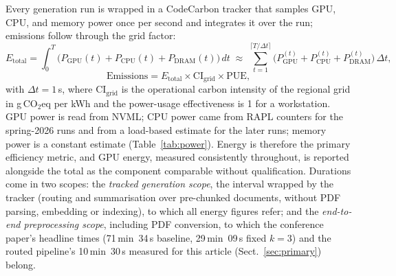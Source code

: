 \documentclass[pdflatex,sn-mathphys-num]{sn-jnl}
\newcommand{\gco}{g\,CO$_2$eq}
\theoremstyle{thmstyleone}%
\theoremstyle{thmstylethree}%
\begin{document}
Every generation run is wrapped in a CodeCarbon tracker \cite{codecarbon_software,lacoste2019quantifyingcarbonemissionsmachine} that samples GPU, CPU, and memory power once per second and integrates it over the run; emissions follow through the grid factor:
\begin{equation}
E_{\mathrm{total}}=\int_{0}^{T}\bigl(P_{\mathrm{GPU}}(t)+P_{\mathrm{CPU}}(t)+P_{\mathrm{DRAM}}(t)\bigr)\,dt
\;\approx\;\sum_{t=1}^{\lceil T/\Delta t\rceil}\bigl(P^{(t)}_{\mathrm{GPU}}+P^{(t)}_{\mathrm{CPU}}+P^{(t)}_{\mathrm{DRAM}}\bigr)\,\Delta t,
\end{equation}
\begin{equation}
\mathrm{Emissions}=E_{\mathrm{total}}\times\mathrm{CI}_{\mathrm{grid}}\times\mathrm{PUE},
\end{equation}
with $\Delta t=1$\,s, where $\mathrm{CI}_{\mathrm{grid}}$ is the operational carbon intensity of the regional grid in \gco{} per kWh and the power-usage effectiveness is 1 for a workstation. GPU power is read from NVML; CPU power came from RAPL counters for the spring-2026 runs and from a load-based estimate for the later runs; memory power is a constant estimate (Table~\ref{tab:power}). Energy is therefore the primary efficiency metric, and GPU energy, measured consistently throughout, is reported alongside the total as the component comparable without qualification. Durations come in two scopes: the \emph{tracked generation scope}, the interval wrapped by the tracker (routing and summarisation over pre-chunked documents, without PDF parsing, embedding or indexing), to which all energy figures refer; and the \emph{end-to-end preprocessing scope}, including PDF conversion, to which the conference paper's headline times (71\,min~34\,s baseline, 29\,min~09\,s fixed $k=3$) and the routed pipeline's 10\,min~30\,s measured for this article (Sect.~\ref{sec:primary}) belong.
\end{document}
